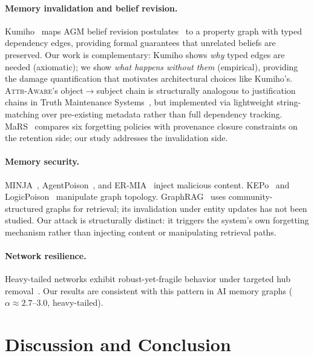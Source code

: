 \documentclass{article}
\newcommand{\attraware}{\textsc{Attr-Aware}}
\begin{document}
\paragraph{Memory invalidation and belief revision.}
Kumiho~\citep{kumiho_2026} maps AGM belief revision postulates~\citep{agm_1985} to a property graph with typed dependency edges, providing formal guarantees that unrelated beliefs are preserved.
Our work is complementary: Kumiho shows \textit{why} typed edges are needed (axiomatic); we show \textit{what happens without them} (empirical), providing the damage quantification that motivates architectural choices like Kumiho's.
\attraware{}'s object$\rightarrow$subject chain is structurally analogous to justification chains in Truth Maintenance Systems~\citep{doyle_tms_1979}, but implemented via lightweight string-matching over pre-existing metadata rather than full dependency tracking.
MaRS~\citep{mars_2025} compares six forgetting policies with provenance closure constraints on the retention side; our study addresses the invalidation side.

\paragraph{Memory security.}
MINJA~\citep{minja_2025}, AgentPoison~\citep{agentpoison_2024}, and ER-MIA~\citep{ermia_2026} inject malicious content.
KEPo~\citep{kepo_2026} and LogicPoison~\citep{logicpoison_2026} manipulate graph topology.
GraphRAG~\citep{edge_graphrag_2024} uses community-structured graphs for retrieval; its invalidation under entity updates has not been studied.
Our attack is structurally distinct: it triggers the system's own forgetting mechanism rather than injecting content or manipulating retrieval paths.

\paragraph{Network resilience.}
Heavy-tailed networks exhibit robust-yet-fragile behavior under targeted hub removal~\citep{albert_attack_2000, cohen_percolation_2000}.
Our results are consistent with this pattern in AI memory graphs ($\alpha \approx 2.7$--$3.0$, heavy-tailed).


\section{Discussion and Conclusion}
\label{sec:conclusion}
\end{document}
